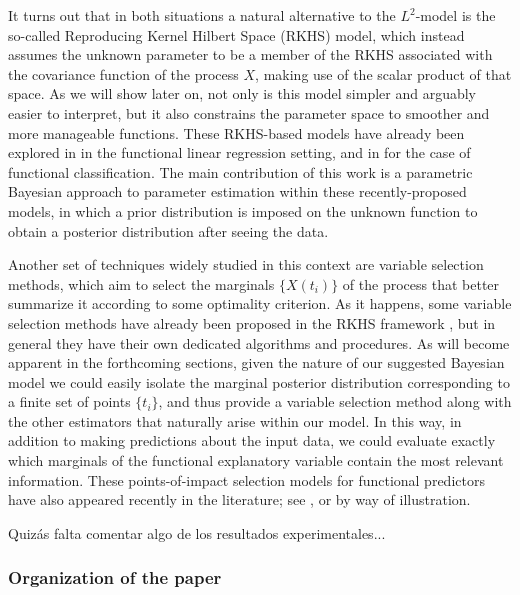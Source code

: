 \documentclass[ba]{imsart}
\numberwithin{equation}{section}
\theoremstyle{plain}
\newenvironment{comment}
{
\noindent \em \color{red}
}
{
\color{black}
}
\begin{document}
It turns out that in both situations a natural alternative to the \(L^2\)-model is the so-called Reproducing Kernel Hilbert Space (RKHS) model, which instead assumes the unknown parameter to be a member of the RKHS associated with the covariance function of the process \(X\), making use of the scalar product of that space. As we will show later on, not only is this model simpler and arguably easier to interpret, but it also constrains the parameter space to smoother and more manageable functions. These RKHS-based models have already been explored in \citet{berrendero2020general} in the functional linear regression setting, and in \citet{berrendero2018use} for the case of functional classification. The main contribution of this work is a parametric Bayesian approach to parameter estimation within these recently-proposed models, in which a prior distribution is imposed on the unknown function to  obtain a posterior distribution after seeing the data.

Another set of techniques widely studied in this context are variable selection methods, which aim to select the marginals \(\{X(t_i)\}\) of the process that better summarize it according to some optimality criterion. As it happens, some variable selection methods have already been proposed in the RKHS framework \citep[see for example][]{berrendero2019rkhs}, but in general they have their own dedicated algorithms and procedures. As will become apparent in the forthcoming sections, given the nature of our suggested Bayesian model we could easily isolate the marginal posterior distribution corresponding to a finite set of points \(\{t_i\}\), and thus provide a variable selection method along with the other estimators that naturally arise within our model. In this way, in addition to making predictions about the input data, we could evaluate exactly which marginals of the functional explanatory variable contain the most relevant information. These points-of-impact selection models for functional predictors have also appeared recently in the literature; see \citet{poss2020superconsistent}, \citet{berrendero2016variable} or \citet{ferraty2010most} by way of illustration.

\begin{comment}
  Quizás falta comentar algo de los resultados experimentales...
\end{comment}

\subsubsection{Organization of the paper}
\end{document}
